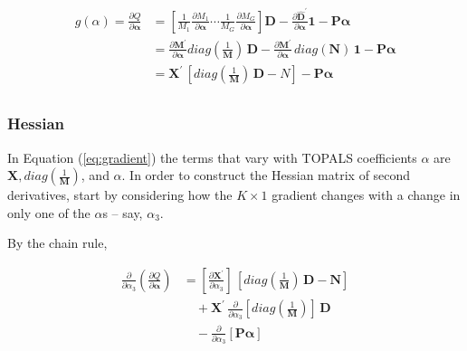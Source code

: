 \documentclass{article}
\begin{document}
\begin{equation}
\begin{aligned}
g(\alpha) = 
  \frac{\partial Q}{\partial\boldsymbol{\alpha}} 
  &= 
   \left[ \tfrac{1}{M_1}\tfrac{\partial M_1}{\partial \boldsymbol{\alpha}}  \cdots
   \tfrac{1}{M_G}\tfrac{\partial M_G}{\partial \boldsymbol{\alpha}}  \right] \boldsymbol{D} -  
\frac{\partial \hat{\boldsymbol{D}}^\prime}{\partial \boldsymbol{\alpha}} \boldsymbol{1}  -  \boldsymbol{P} \boldsymbol{\alpha}
 \\
&= \frac{\partial \boldsymbol{M}^\prime}{\partial \boldsymbol{\alpha}} diag(\frac{1}{\boldsymbol{M}}) \, \boldsymbol{D} - \frac{\partial \boldsymbol{M}^\prime}{\partial \boldsymbol{\alpha}} \, diag(\boldsymbol{N}) \, \boldsymbol{1}
-  \boldsymbol{P} \boldsymbol{\alpha} \\
&= \boldsymbol{X}^\prime \, \left[ diag(\frac{1}{\boldsymbol{M}}) \, \boldsymbol{D} - N \right] 
-  \boldsymbol{P} \boldsymbol{\alpha} \\
\end{aligned}  \label{eq:gradient}
\end{equation}


\subsubsection{Hessian}

In Equation (\ref{eq:gradient}) the terms that vary with TOPALS coefficients $\alpha$ are $\mathbf{X}, diag (\tfrac{1}{\mathbf{M}})$, and $\alpha$.  In order to construct the Hessian matrix of second derivatives, start by considering how the $K \times 1$ gradient changes with a change in only one of the $\alpha$s -- say, $\alpha_3$.

By the chain rule, 

\begin{equation}
\begin{aligned}
  \frac{\partial}{\partial \alpha_3}
  \left( \frac{\partial Q}{\partial\boldsymbol{\alpha}} \right)
&= \left[  \frac{\partial \boldsymbol{X}^\prime}{\partial \alpha_3}  \right]\,\left[ diag(\frac{1}{\boldsymbol{M}}) \,  \boldsymbol{D} - \boldsymbol{N} \right]\\
&\quad +
 \boldsymbol{X}^\prime\, \frac{\partial}{\partial \alpha_3} \left[ diag(\frac{1}{\boldsymbol{M}}) \right]\, \boldsymbol{D} \\
&\quad - \frac{\partial}{\partial \alpha_3} \left[ \boldsymbol{P} \boldsymbol{\alpha} \right]
\end{aligned}  \label{eq:part-of-hessian}
\end{equation}
\end{document}
